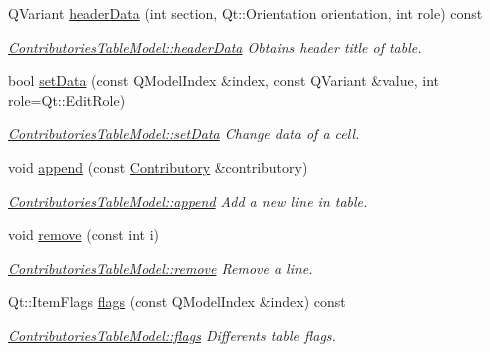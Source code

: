 \begin{DoxyCompactItemize}
Q\-Variant \hyperlink{classGui_1_1Widgets_1_1WdgModels_1_1ContributoriesTableModel_ac08635d8660ddd4444d7f2b75ae3d0ef}{header\-Data} (int section, Qt\-::\-Orientation orientation, int role) const 
\begin{DoxyCompactList}\small\item\em \hyperlink{classGui_1_1Widgets_1_1WdgModels_1_1ContributoriesTableModel_ac08635d8660ddd4444d7f2b75ae3d0ef}{Contributories\-Table\-Model\-::header\-Data} Obtains header title of table. \end{DoxyCompactList}\item 
bool \hyperlink{classGui_1_1Widgets_1_1WdgModels_1_1ContributoriesTableModel_a1c9f7969dc52e5840acfc122fcb2ab48}{set\-Data} (const Q\-Model\-Index \&index, const Q\-Variant \&value, int role=Qt\-::\-Edit\-Role)
\begin{DoxyCompactList}\small\item\em \hyperlink{classGui_1_1Widgets_1_1WdgModels_1_1ContributoriesTableModel_a1c9f7969dc52e5840acfc122fcb2ab48}{Contributories\-Table\-Model\-::set\-Data} Change data of a cell. \end{DoxyCompactList}\item 
void \hyperlink{classGui_1_1Widgets_1_1WdgModels_1_1ContributoriesTableModel_a6d3f0ab976abd9993b731b27fbe3a404}{append} (const \hyperlink{classModels_1_1Contributory}{Contributory} \&contributory)
\begin{DoxyCompactList}\small\item\em \hyperlink{classGui_1_1Widgets_1_1WdgModels_1_1ContributoriesTableModel_a6d3f0ab976abd9993b731b27fbe3a404}{Contributories\-Table\-Model\-::append} Add a new line in table. \end{DoxyCompactList}\item 
void \hyperlink{classGui_1_1Widgets_1_1WdgModels_1_1ContributoriesTableModel_a76666bbbc940867b6ff3366424f72e26}{remove} (const int i)
\begin{DoxyCompactList}\small\item\em \hyperlink{classGui_1_1Widgets_1_1WdgModels_1_1ContributoriesTableModel_a76666bbbc940867b6ff3366424f72e26}{Contributories\-Table\-Model\-::remove} Remove a line. \end{DoxyCompactList}\item 
Qt\-::\-Item\-Flags \hyperlink{classGui_1_1Widgets_1_1WdgModels_1_1ContributoriesTableModel_a6bf3e8c45bb499e82546be456a7de77b}{flags} (const Q\-Model\-Index \&index) const 
\begin{DoxyCompactList}\small\item\em \hyperlink{classGui_1_1Widgets_1_1WdgModels_1_1ContributoriesTableModel_a6bf3e8c45bb499e82546be456a7de77b}{Contributories\-Table\-Model\-::flags} Differents table flags. \end{DoxyCompactList}\item 

\end{DoxyCompactItemize}
